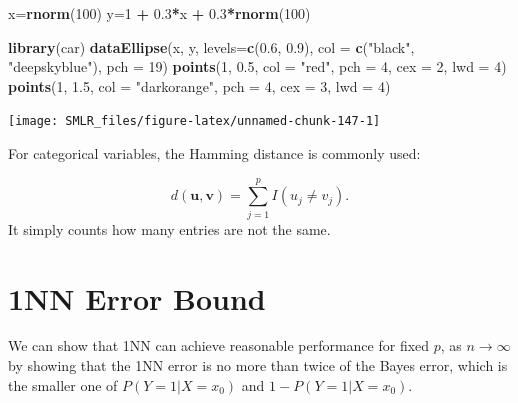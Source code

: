 \documentclass[
]{book}
\newenvironment{Shaded}{\begin{snugshade}}{\end{snugshade}}
\newcommand{\AttributeTok}[1]{\textcolor[rgb]{0.13,0.29,0.53}{#1}}
\newcommand{\DecValTok}[1]{\textcolor[rgb]{0.00,0.00,0.81}{#1}}
\newcommand{\FloatTok}[1]{\textcolor[rgb]{0.00,0.00,0.81}{#1}}
\newcommand{\FunctionTok}[1]{\textcolor[rgb]{0.13,0.29,0.53}{\textbf{#1}}}
\newcommand{\NormalTok}[1]{#1}
\newcommand{\OtherTok}[1]{\textcolor[rgb]{0.56,0.35,0.01}{#1}}
\newcommand{\SpecialCharTok}[1]{\textcolor[rgb]{0.81,0.36,0.00}{\textbf{#1}}}
\newcommand{\StringTok}[1]{\textcolor[rgb]{0.31,0.60,0.02}{#1}}
\theoremstyle{definition}
\theoremstyle{definition}
\theoremstyle{definition}
\theoremstyle{definition}
\theoremstyle{remark}
\begin{document}
\begin{Shaded}
\begin{Highlighting}[]
\NormalTok{  x}\OtherTok{=}\FunctionTok{rnorm}\NormalTok{(}\DecValTok{100}\NormalTok{)}
\NormalTok{  y}\OtherTok{=}\DecValTok{1} \SpecialCharTok{+} \FloatTok{0.3}\SpecialCharTok{*}\NormalTok{x }\SpecialCharTok{+} \FloatTok{0.3}\SpecialCharTok{*}\FunctionTok{rnorm}\NormalTok{(}\DecValTok{100}\NormalTok{)}

  \FunctionTok{library}\NormalTok{(car)}
  \FunctionTok{dataEllipse}\NormalTok{(x, y, }\AttributeTok{levels=}\FunctionTok{c}\NormalTok{(}\FloatTok{0.6}\NormalTok{, }\FloatTok{0.9}\NormalTok{), }\AttributeTok{col =} \FunctionTok{c}\NormalTok{(}\StringTok{"black"}\NormalTok{, }\StringTok{"deepskyblue"}\NormalTok{), }\AttributeTok{pch =} \DecValTok{19}\NormalTok{)}
  \FunctionTok{points}\NormalTok{(}\DecValTok{1}\NormalTok{, }\FloatTok{0.5}\NormalTok{, }\AttributeTok{col =} \StringTok{"red"}\NormalTok{, }\AttributeTok{pch =} \DecValTok{4}\NormalTok{, }\AttributeTok{cex =} \DecValTok{2}\NormalTok{, }\AttributeTok{lwd =} \DecValTok{4}\NormalTok{)}
  \FunctionTok{points}\NormalTok{(}\DecValTok{1}\NormalTok{, }\FloatTok{1.5}\NormalTok{, }\AttributeTok{col =} \StringTok{"darkorange"}\NormalTok{, }\AttributeTok{pch =} \DecValTok{4}\NormalTok{, }\AttributeTok{cex =} \DecValTok{3}\NormalTok{, }\AttributeTok{lwd =} \DecValTok{4}\NormalTok{)}
\end{Highlighting}
\end{Shaded}

\begin{center}\texttt{[image: SMLR\_files/figure-latex/unnamed-chunk-147-1]} \end{center}

For categorical variables, the Hamming distance is commonly used:

\[d(\mathbf{u}, \mathbf{v}) = \sum_{j=1}^p I(u_j \neq v_j).\]
It simply counts how many entries are not the same.

\hypertarget{nn-error-bound}{%
\section{1NN Error Bound}\label{nn-error-bound}}

We can show that 1NN can achieve reasonable performance for fixed \(p\), as \(n \rightarrow \infty\) by showing that the 1NN error is no more than twice of the Bayes error, which is the smaller one of \(P(Y = 1 | X = x_0)\) and \(1 - P(Y = 1 | X = x_0)\).
\end{document}
